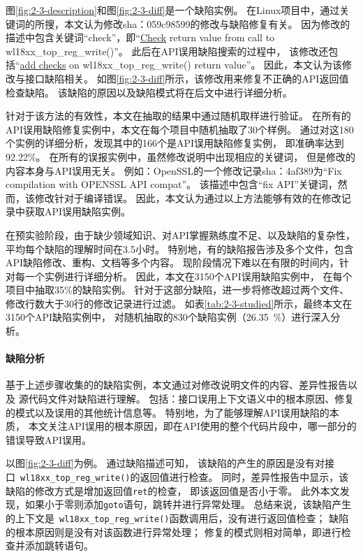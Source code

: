 图\ref{fig:2-3-description}和图\ref{fig:2-3-diff}是一个缺陷实例。
在Linux项目中，通过关键词的所搜，本文认为修改sha：059c98599的修改与缺陷修复有关。
因为修改的描述中包含关键词“check”，即“\underline{Check} return value from call to wl18xx\_top\_reg\_write()”。
此后在API误用缺陷搜索的过程中，
该修改还包括“\underline{add checks} on wl18xx\_top\_reg\_write() return value”。
因此，本文认为该修改与接口缺陷相关。
如图\ref{fig:2-3-diff}所示，该修改用来修复不正确的API返回值检查缺陷。
该缺陷的原因以及缺陷模式将在后文中进行详细分析。

针对于该方法的有效性，本文在抽取的结果中通过随机取样进行验证。
在所有的API误用缺陷修复实例中，本文在每个项目中随机抽取了30个样例。
通过对这180个实例的详细分析，发现其中的166个是API误用缺陷修复实例，
即准确率达到92.22\%。
在所有的误报实例中，虽然修改说明中出现相应的关键词，
但是修改的内容本身与API误用无关。
例如：OpenSSL的一个修改记录sha：4af389为“Fix compilation with OPENSSL API compat”。
该描述中包含“fix API”关键词，然而，该修改针对于编译错误。
因此，本文认为通过以上方法能够有效的在修改记录中获取API误用缺陷实例。

在预实验阶段，由于缺少领域知识、对API掌握熟练度不足、以及缺陷的复杂性，
平均每个缺陷的理解时间在3.5小时。
特别地，有的缺陷报告涉及多个文件，包含API缺陷修改、重构、文档等多个内容。
现阶段情况下难以在有限的时间内，针对每一个实例进行详细分析。
因此，本文在3150个API误用缺陷实例中，
在每个项目中抽取35\%的缺陷实例。
针对于这部分缺陷，进一步将修改超过两个文件、修改行数大于30行的修改记录进行过滤。
如表\ref{tab:2-3-studied}所示，最终本文在3150个API缺陷实例中，
对随机抽取的830个缺陷实例（26.35~\%）进行深入分析。


\paragraph{缺陷分析}
基于上述步骤收集的的缺陷实例，本文通过对修改说明文件的内容、差异性报告以及
源代码文件对缺陷进行理解。
包括：接口误用上下文语义中的根本原因、修复的模式以及误用的其他统计信息等。
特别地，为了能够理解API误用缺陷的本质，
本文关注API误用的根本原因，即在API使用的整个代码片段中，哪一部分的错误导致API误用。

以图\ref{fig:2-3-diff}为例。
通过缺陷描述可知，
该缺陷的产生的原因是没有对接口~\texttt{wl18xx\_top\_reg\_write()}的返回值进行检查。
同时，差异性报告中显示，该缺陷的修改方式是增加返回值\texttt{ret}的检查，
即该返回值是否小于零。
此外本文发现，如果小于零则添加\texttt{goto}语句，跳转并进行异常处理。
总结来说，该缺陷产生的上下文是~\texttt{wl18xx\_top\_reg\_write()}函数调用后，没有进行返回值检查；
缺陷的根本原因则是没有对该函数进行异常处理；
修复的模式则相对简单，即进行检查并添加跳转语句。


